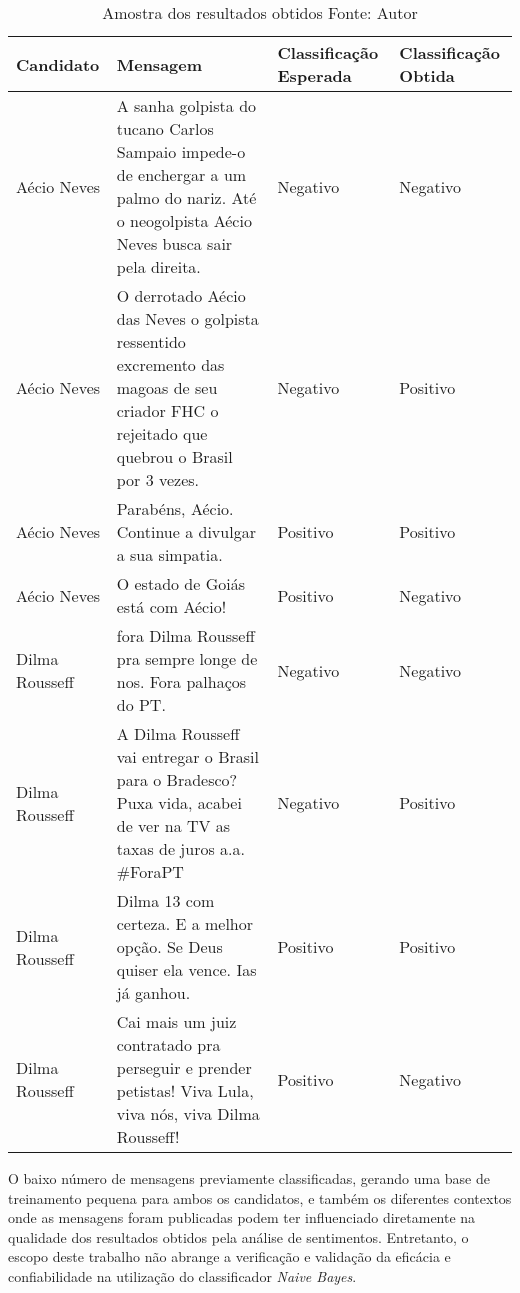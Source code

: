 \begin{table}[!ht]
  \centering
  \begin{tabular}{|p{2.8cm}|p{5cm}|p{2cm}|p{2cm}|}
	\hline
	Candidato & Mensagem & Classificação Esperada & Classificação Obtida
	\\ \hline
	Aécio Neves & A sanha golpista do tucano Carlos Sampaio impede-o de enchergar a um palmo do nariz. Até o neogolpista Aécio Neves busca sair pela direita. & Negativo & Negativo
	\\ \hline
	Aécio Neves & O derrotado Aécio das Neves o golpista ressentido excremento das magoas de seu criador FHC o rejeitado que quebrou o Brasil por 3 vezes. & Negativo & Positivo
	\\ \hline
	Aécio Neves & Parabéns, Aécio. Continue a divulgar a sua simpatia. & Positivo & Positivo
	\\ \hline
	Aécio Neves & O estado de Goiás está com Aécio! & Positivo & Negativo
	\\ \hline
	Dilma Rousseff & fora Dilma Rousseff pra sempre longe de nos. Fora palhaços do PT. & Negativo & Negativo
	\\ \hline
	Dilma Rousseff & A Dilma Rousseff vai entregar o Brasil para o Bradesco? Puxa vida, acabei de ver na TV as taxas de juros a.a. \#ForaPT & Negativo & Positivo
	\\ \hline
	Dilma Rousseff & Dilma 13 com certeza. E a melhor opção. Se Deus quiser ela vence. Ias já ganhou. & Positivo & Positivo
	\\ \hline
	Dilma Rousseff & Cai mais um juiz contratado pra perseguir e prender petistas! Viva Lula, viva nós, viva Dilma Rousseff! & Positivo & Negativo
	\\ \hline
  \end{tabular}
  \captionsetup{justification=centering}
  \caption[Amostra dos resultados obtidos]{Amostra dos resultados obtidos
  \protect\linebreak Fonte: Autor}
\label{tab-sent-ana}
\end{table}
\FloatBarrier

O baixo número de mensagens previamente classificadas, gerando uma base de treinamento pequena para ambos os candidatos, e também os diferentes contextos onde as mensagens foram publicadas podem ter influenciado diretamente na qualidade dos resultados obtidos pela análise de sentimentos. Entretanto, o escopo deste trabalho não abrange a verificação e validação da eficácia e confiabilidade na utilização do classificador \textit{Naive Bayes}.

